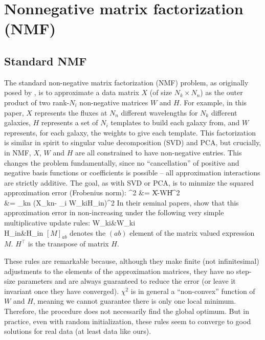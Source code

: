 \documentclass[10pt,preprint]{aastex}
\def\beqa#1\eeqa{\begin{align}#1\end{align}}
\newcommand{\T}{^{\scriptscriptstyle \top}}
\newcommand{\XX}{X}
\newcommand{\XXh}{\hat{X}}
\newcommand{\Xkn}{X_{kn}}
\newcommand{\WW}{W}
\newcommand{\Wki}{W_{ki}}
\newcommand{\HH}{H}
\newcommand{\Hin}{H_{in}}
\begin{document}

 

\appendix

\section{Nonnegative matrix factorization (NMF)}
\label{nmf}

\subsection{Standard NMF}
The standard non-negative matrix factorization (NMF) problem, as
originally posed by \cite{lee00a}, is to approximate a data matrix
$\XX$ (of size $N_k\times N_n$) as the outer product of two rank-$N_i$
non-negative matrices $\WW$ and $\HH$. For example, in this paper,
$\XX$ represents the fluxes at $N_n$ different wavelengths for $N_k$
different galaxies, $\HH$ represents a set of $N_i$ templates to build
each galaxy from, and $\WW$ represents, for each galaxy, the weights
to give each template. This factorization is similar in spirit to
singular value decomposition (SVD) and PCA, but crucially, in NMF,
$\XX$, $\WW$ and $\HH$ are all constrained to have non-negative
entries. This changes the problem fundamentally, since no
``cancellation'' of positive and negative basis functions or
coefficients is possible -- all approximation interactions are
strictly additive. The goal, as with SVD or PCA, is to minmize the
squared approximation error (Frobenius norm): \beqa \label{eq:nmfcost}
\chi^2 &= \|\XX-\WW\HH\|^2\\
&= \sum_{kn} \left(\Xkn - \sum_i \Wki\Hin \right)^2
\eeqa
In their seminal papers, \cite{lee00a} show that this approximation
error in non-increasing under the following very simple multiplicative
update rules: 
\beqa \label{eq:wupdate}
\Wki &\leftarrow \Wki \frac{[\XX\HH\T]_{ki}}{[\WW\HH\HH\T]_{ki}}\\
\label{eq:hupdate}
\Hin &\leftarrow \Hin \frac{[\WW\T\XX]_{in}}{[\WW\T\WW\HH]_{in}}
\eeqa
$[M]_{ab}$ denotes the $(ab)$ element of the matrix valued expression
$M$. $\HH\T$ is the transpose of matrix $\HH$.

These rules are remarkable because, although they make finite (not
infinitesimal) adjustments to the elements of the approximation
matrices, they have no step-size parameters and are always guaranteed
to reduce the error (or leave it invariant once they have converged).
$\chi^2$ is in general a ``non-convex'' function of $\WW$ and $\HH$,
meaning we cannot guarantee there is only one local
minimum. Therefore, the procedure does not necessarily find the global
optimum. But in practice, even with random initialization, these rules
seem to converge to good solutions for real data (at least data like
ours).
\end{document}
